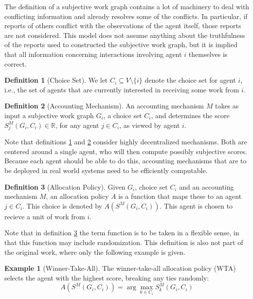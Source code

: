 \documentclass[a4paper,11pt]{book}
\newcommand{\bb}{\mathbb}
\theoremstyle{definition}
\newtheorem{definition}{Definition}
\newtheorem*{example}{Example}
\begin{document}
The definition of a subjective work graph contains a lot of machinery to deal with conflicting information
and already resolves some of the conflicts. In particular, if reports of others conflict with the observations
of the agent itself, those reports are not considered. This model does not assume anything about the truthfulness
of the reports used to constructed the subjective work graph, but it is implied that all information concerning
interactions involving agent $i$ themselves is correct.

\begin{definition}[Choice Set]
    We let $C_i \subseteq V \setminus \{i\}$ denote the choice set for agent $i$, i.e., the set of agents that
    are currently interested in receiving some work from $i$.
    \label{def:choice_set}
\end{definition}

\begin{definition}[Accounting Mechanism]
   An accounting mechanism $M$ takes as input a subjective work graph $G_i$, a choice set $C_i$, and
   determines the score $S_j^M(G_i, C_i) \in \bb{R}$, for any agent $j \in C_i$, as viewed by agent
   $i$.
   \label{def:acc_mech}
\end{definition}

Note that definitions \ref{def:choice_set} and \ref{def:acc_mech} consider highly decentralized mechanisms.
Both are centered around a single agent, who will then compute possibly subjective scores. Because each
agent should be able to do this, accounting mechanisms that are to be deployed in real world systems need
to be efficiently computable. 

\begin{definition}[Allocation Policy]
    Given $G_i$, choice set $C_i$ and an accounting mechanism $M$, an allocation policy $A$
    is a function that maps these to an agent $j \in C_i$. This choice is denoted
    by $A(S^M(G_i, C_i))$. This agent is chosen to recieve a unit of work from $i$.
    \label{def:all_pol}
\end{definition}

Note that in definition \ref{def:all_pol} the term function is to be taken in a flexible sense,
in that this function may include randomization. This definition is also not part of the original work,
where only the following example is given.

\begin{example}[Winner-Take-All]
   The winner-take-all allocation policy (WTA) selects the agent with the highest score,
   breaking any ties randomly:
   \begin{equation*}
       A(S^M(G_i, C_i)) = \arg \max_{k\in C_i} S_k^M(G_i, C_i) 
   \end{equation*}
\end{example}
\end{document}
